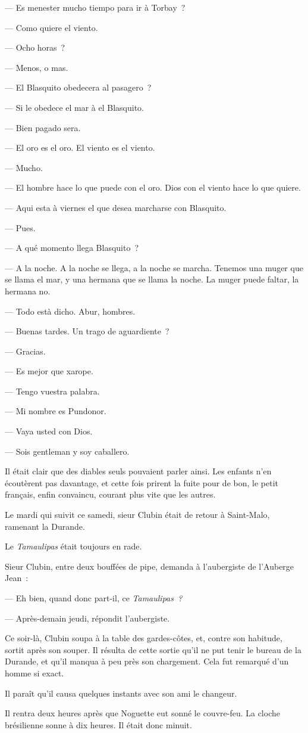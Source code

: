 \documentclass[french,twoside]{book} %
\begin{document}
— Es menester mucho tiempo para ir à Torbay ?\par
— Como quiere el viento.\par
— Ocho horas ?\par
 — Menos, o mas.\par
— El Blasquito obedecera al pasagero ?\par
— Si le obedece el mar à el Blasquito.\par
— Bien pagado sera.\par
— El oro es el oro. El viento es el viento.\par
— Mucho.\par
— El hombre hace lo que puede con el oro. Dios con el viento hace lo que quiere.\par
— Aqui esta à viernes el que desea marcharse con Blasquito.\par
— Pues.\par
— A qué momento llega Blasquito ?\par
— A la noche. A la noche se llega, a la noche se marcha. Tenemos una muger que se llama el mar, y una hermana que se llama la noche. La muger puede faltar, la hermana no.\par
— Todo està dicho. Abur, hombres.\par
 — Buenas tardes. Un trago de aguardiente ?\par
— Gracias.\par
— Es mejor que xarope.\par
— Tengo vuestra palabra.\par
— Mi nombre es Pundonor.\par
— Vaya usted con Dios.\par
— Sois gentleman y soy caballero.\par
Il était clair que des diables seuls pouvaient parler ainsi. Les enfants n’en écoutèrent pas davantage, et cette fois prirent la fuite pour de bon, le petit français, enfin convaincu, courant plus vite que les autres.\par
Le mardi qui suivit ce samedi, sieur Clubin était de retour à Saint-Malo, ramenant la Durande.\par
Le \emph{Tamaulipas} était toujours en rade.\par
Sieur Clubin, entre deux bouffées de pipe, demanda à l’aubergiste de l’Auberge Jean :\par
— Eh bien, quand donc part-il, ce \emph{Tamaulipas ?}\par
— Après-demain jeudi, répondit l’aubergiste.\par
Ce soir-là, Clubin soupa à la table des gardes-côtes, et, contre son habitude, sortit après son souper. Il résulta de cette sortie qu’il ne put tenir le bureau de  la Durande, et qu’il manqua à peu près son chargement. Cela fut remarqué d’un homme si exact.\par
Il paraît qu’il causa quelques instants avec son ami le changeur.\par
Il rentra deux heures après que Noguette eut sonné le couvre-feu. La cloche brésilienne sonne à dix heures. Il était donc minuit.
\end{document}
